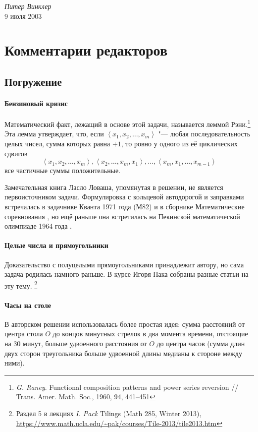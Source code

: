 \documentclass[twoside]{book}
\begin{document}
\begin{flushright}
\emph{Питер Винклер}
\\
9 июля 2003
\end{flushright}

\appendix

\chapter{Комментарии редакторов}

\section{Погружение}

\subsubsection*{Бензиновый кризис} %
Математический факт, лежащий в основе этой задачи, называется леммой Рэни.\footnote{\emph{G. Raney}. Functional composition patterns and power series reversion /\!/ Trans. Amer. Math. Soc., 1960, 94, 441--451}
Эта лемма утверждает, что, если 
$\left<x_1, x_2,\ldots, x_m\right>$ "--- любая последовательность целых чисел, сумма 
которых равна $+1$, то ровно у одного из её циклических сдвигов 
$$\left<x_1, x_2,\ldots , x_m\right>, \left<x_2, \ldots, x_m, x_1\right>, \ldots, \left<x_m, x_1, \ldots, x_{m-1}\right>$$
все частичные суммы  положительные. 

Замечательная книга Ласло Ловаша, упомянутая в решении, не является первоисточником задачи.
Формулировка с кольцевой автодорогой и заправками встречалась в задачнике Кванта 1971 года (М82)
и в сборнике Математические соревнования \cite[задачи 76 и 77]{матсоревнования}, но ещё раньше она встретилась на Пекинской математической олимпиаде 1964 года \cite[№26.6]{зарубежные}.


\subsubsection*{Целые числа и прямоугольники} %
Доказательство с полуцелыми прямоугольниками принадлежит автору, но сама задача родилась намного раньше.
В курсе Игоря Пака собраны разные статьи на эту тему.%
\footnote{Раздел 5 в лекциях \emph{I. Pack} Tilings (Math 285, Winter 2013), \url{https://www.math.ucla.edu/~pak/courses/Tile-2013/tile2013.htm}}

\subsubsection*{Часы на столе} %
В авторском решении использовалась более простая идея: сумма расстояний от центра стола $O$ до концов минутных стрелок в два момента времени, отстоящие на 30 минут, больше удвоенного расстояния от $O$ до центра часов (сумма длин двух сторон треугольника больше удвоенной длины медианы к стороне между ними).
\end{document}
